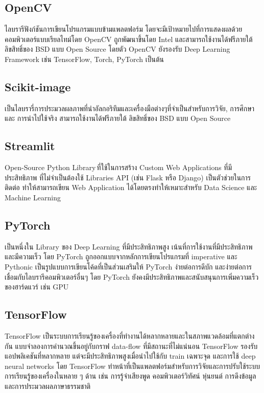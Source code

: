 \documentclass[12pt,oneside,openright,a4paper]{cpe-thai-project}
\begin{document}
\subsection{OpenCV}
ไลบรารีฟังก์ชันการเขียนโปรแกรมแบบข้ามแพลตฟอร์ม  โดยจะมีเป้าหมายไปที่การแสดงผลด้วยคอมพิวเตอร์แบบเรียลไทม์โดย OpenCV ถูกพัฒนาขึ้นโดย Intel และสามารถใช้งานได้ฟรีภายใต้ ลิขสิทธิ์ของ BSD แบบ Open Source โดยตัว OpenCV ยังรองรับ Deep Learning Framework เช่น TensorFlow, Torch, PyTorch เป็นต้น \cite{26}
\subsection{Scikit-image}
เป็นไลบรารี่การประมวลผลภาพที่นำอัลกอริทึมและเครื่องมือต่างๆที่จำเป็นสำหรับการวิจัย, การศึกษา และ การนำไปใช้จริง สามารถใช้งานได้ฟรีภายใต้ ลิขสิทธิ์ของ BSD แบบ Open Source \cite{scikit-image}
\subsection{Streamlit}
Open-Source Python Library ที่ใช้ในการสร้าง Custom Web Applications ที่มีประสิทธิภาพ ที่ไม่จำเป็นต้องใช้ Libraries API (เช่น Flask หรือ Django) เป็นตัวช่วยในการติดต่อ ทำให้สามารถเขียน Web Application ได้โดยตรงทำให้เหมาะสำหรับ Data Science และ Machine Learning \cite{27}
\subsection{PyTorch}
เป็นหนึ่งใน Library ของ Deep Learning ที่มีประสิทธิภาพสูง เน้นที่การใช้งานที่มีประสิทธิภาพและมีความเร็ว โดย PyTorch ถูกออกแบบจากหลักการเขียนโปรแกรมที่ imperative และ Pythonic เป็นรูปแบบการเขียนโค้ดที่เป็นส่วนเสริมให้ PyTorch ง่ายต่อการดีบัก และง่ายต่อการเชื่อมกับไลบรารีคอมพิวเตอร์อื่นๆ โดย PyTorch ยังคงมีประสิทธิภาพและสนับสนุนการเพิ่มความเร็วของฮาร์ดแวร์ เช่น GPU 
 \cite{NEURIPS2019_bdbca288}

 \subsection{TensorFlow}
 TensorFlow เป็นระบบการเรียนรู้ของเครื่องที่ทํางานได้หลากหลายและในสภาพแวดล้อมที่แตกต่างกัน แบบจำลองการคํานวณขึ้นอยู่กับกราฟ data-flow ที่มีสถานะที่ไม่แน่นอน TensorFlow รองรับแอปพลิเคชันที่หลากหลาย แต่จะมีประสิทธิภาพสูงเมื่อนำไปใช้กับ train เฉพาะจุด  และการใช้ deep neural networks โดย TensorFlow ทําหน้าที่เป็นแพลตฟอร์มสําหรับการวิจัยและการปรับใช้ระบบการเรียนรู้ของเครื่องในหลาย ๆ ด้าน เช่น การรู้จําเสียงพูด คอมพิวเตอร์วิทัศน์ หุ่นยนต์ การดึงข้อมูล และการประมวลผลภาษาธรรมชาติ 
  \cite{tensor}
\end{document}
